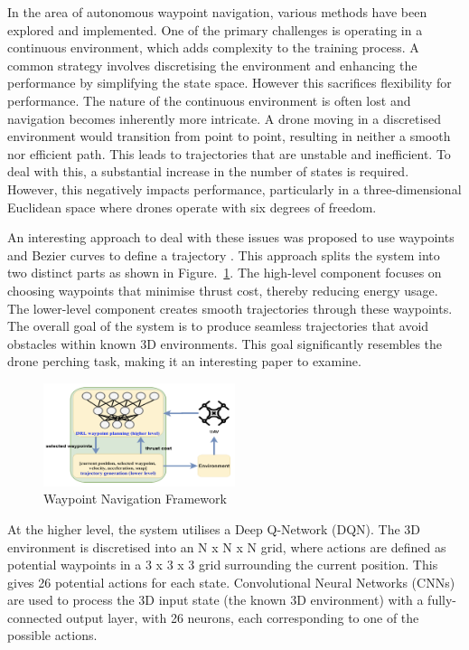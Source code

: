 In the area of autonomous waypoint navigation, various methods have been explored and implemented.
One of the primary challenges is operating in a continuous environment, which adds complexity to the training process.
A common strategy involves discretising the environment and enhancing the performance by simplifying the state space.
However this sacrifices flexibility for performance.
The nature of the continuous environment is often lost and navigation becomes inherently more intricate.
A drone moving in a discretised environment would transition from point to point, resulting in neither a smooth nor efficient path.
This leads to trajectories that are unstable and inefficient.
To deal with this, a substantial increase in the number of states is required.
However, this negatively impacts performance, particularly in a three-dimensional Euclidean space where drones operate with six degrees of freedom.

An interesting approach to deal with these issues was proposed to use waypoints and Bezier curves to define a trajectory \cite{fyp12-waypoint-navigation}.
This approach splits the system into two distinct parts as shown in Figure.~\ref{fig:fyp12-waypoint-nav-framework}.
The high-level component focuses on choosing waypoints that minimise thrust cost, thereby reducing energy usage.
The lower-level component creates smooth trajectories through these waypoints.
The overall goal of the system is to produce seamless trajectories that avoid obstacles within known 3D environments.
This goal significantly resembles the drone perching task, making it an interesting paper to examine.

\begin{figure}[htbp]
  \centering
  \includegraphics[width=0.5\textwidth]{background/fyp12-waypoint-nav-framework.png}
  \caption{Waypoint Navigation Framework}
\label{fig:fyp12-waypoint-nav-framework}
\end{figure}

At the higher level, the system utilises a Deep Q-Network (DQN).
The 3D environment is discretised into an N x N x N grid, where actions are defined as potential waypoints in a 3 x 3 x 3 grid surrounding the current position.
This gives 26 potential actions for each state.
Convolutional Neural Networks (CNNs) are used to process the 3D input state (the known 3D environment) with a fully-connected output layer, with 26 neurons, each corresponding to one of the possible actions.

